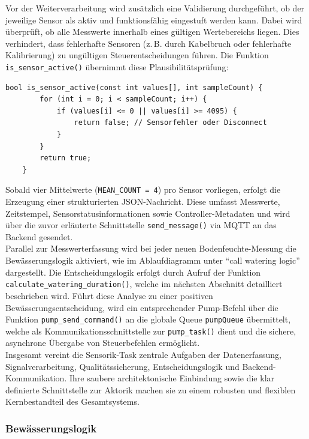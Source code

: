 \noindent Vor der Weiterverarbeitung wird zusätzlich eine Validierung durchgeführt, ob der jeweilige Sensor als aktiv und funktionsfähig eingestuft werden kann. Dabei wird überprüft, ob alle Messwerte innerhalb eines gültigen Wertebereichs liegen. Dies verhindert, dass fehlerhafte Sensoren (z.\,B. durch Kabelbruch oder fehlerhafte Kalibrierung) zu ungültigen Steuerentscheidungen führen. Die Funktion \texttt{is\_sensor\_active()} übernimmt diese Plausibilitätsprüfung:
\\

\begin{lstlisting}[style=cstyle, caption={Überprüfung der Sensoraktivität}, label={lst:sensor_active}]
	bool is_sensor_active(const int values[], int sampleCount) {
		for (int i = 0; i < sampleCount; i++) {
			if (values[i] <= 0 || values[i] >= 4095) {
				return false; // Sensorfehler oder Disconnect
			}
		}
		return true;
	}
\end{lstlisting}
\vspace{1em}

\noindent Sobald vier Mittelwerte (\texttt{MEAN\_COUNT = 4}) pro Sensor vorliegen, erfolgt die Erzeugung einer strukturierten JSON-Nachricht. Diese umfasst Messwerte, Zeitstempel, Sensorstatusinformationen sowie Controller-Metadaten und wird über die zuvor erläuterte Schnittstelle \texttt{send\_message()} via MQTT an das Backend gesendet.
\\
Parallel zur Messwerterfassung wird bei jeder neuen Bodenfeuchte-Messung die Bewässerungslogik aktiviert, wie im Ablaufdiagramm unter \enquote{call watering logic} dargestellt. Die Entscheidungslogik erfolgt durch Aufruf der Funktion \texttt{calculate\_watering\_duration()}, welche im nächsten Abschnitt detailliert beschrieben wird. Führt diese Analyse zu einer positiven Bewässerungsentscheidung, wird ein entsprechender Pump-Befehl über die Funktion \texttt{pump\_send\_command()} an die globale Queue \texttt{pumpQueue} übermittelt, welche als Kommunikationsschnittstelle zur \texttt{pump\_task()} dient und die sichere, asynchrone Übergabe von Steuerbefehlen ermöglicht.
\\
Insgesamt vereint die Sensorik-Task zentrale Aufgaben der Datenerfassung, Signalverarbeitung, Qualitätssicherung, Entscheidungslogik und Backend-Kommunikation. Ihre saubere architektonische Einbindung sowie die klar definierte Schnittstelle zur Aktorik machen sie zu einem robusten und flexiblen Kernbestandteil des Gesamtsystems.

\subsubsection{Bewässerungslogik}

